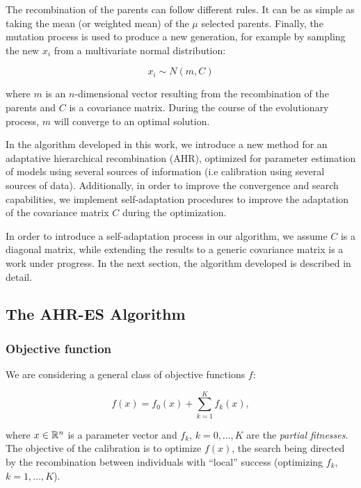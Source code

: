 The recombination of the parents can follow different rules. It can be as simple as taking the mean (or weighted mean) of the $\mu$ selected parents. Finally, the mutation process is used to produce a new generation, for example by sampling the new $x_i$ from a multivariate normal distribution:

$$x_i \sim N(m, C)$$

\noindent where $m$ is an $n$-dimensional vector resulting from the recombination of the parents and $C$ is a covariance matrix. During the course of the evolutionary process, $m$ will converge to an optimal solution. 

In the algorithm developed in this work, we introduce a new method for an adaptative hierarchical recombination (AHR), optimized for parameter estimation of models using several sources of information (i.e calibration using several sources of data). 
Additionally, in order to improve the convergence and search capabilities, we implement self-adaptation procedures  to improve the adaptation of the covariance matrix $C$ during the optimization. 

In order to introduce a self-adaptation process in our algorithm, we assume $C$ is a diagonal matrix, while extending the results to a generic covariance matrix is a work under progress. In the next section, the algorithm developed is described in detail.

\subsection{The AHR-ES Algorithm}

\subsubsection{Objective function}

We are considering a general class of objective functions $f$:

\begin{equation}
f(x) = f_0(x) + \sum_{k=1}^K f_k(x),
\end{equation}

\noindent where $x \in \mathbb{R}^n$ is a parameter vector and $f_k$, $k=0,\ldots, K$ are the \emph{partial fitnesses}. The objective of the calibration is to optimize $f(x)$, the search being directed by the recombination between individuals with ``local'' success (optimizing $f_k$, $k=1,\ldots, K$). 

